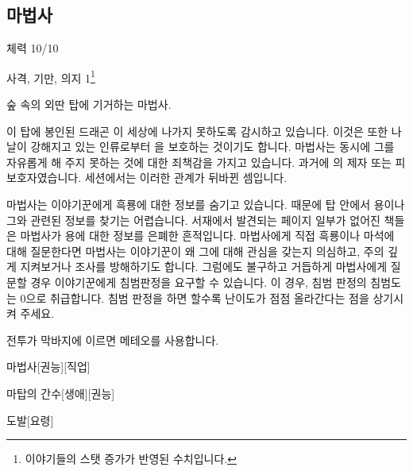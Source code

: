 \documentclass{report}
\begin{document}
	\subsection*{마법사}
		체력 10/10
		
		사격, 기만, 의지 1\footnote{이야기들의 스탯 증가가 반영된 수치입니다.}
		
		숲 속의 외딴 탑에 기거하는 마법사.

		이 탑에 봉인된 드래곤 이 세상에 나가지 못하도록 감시하고 있습니다. 이것은 또한 나날이 강해지고 있는 인류로부터 을 보호하는 것이기도 합니다. 마법사는 동시에 그를 자유롭게 해 주지 못하는 것에 대한 죄책감을 가지고 있습니다. 과거에 의 제자 또는 피보호자였습니다. 세션에서는 이러한 관계가 뒤바뀐 셈입니다.
		
		마법사는 이야기꾼에게 흑룡에 대한 정보를 숨기고 있습니다. 때문에 탑 안에서 용이나 그와 관련된 정보를 찾기는 어렵습니다. 서재에서 발견되는 페이지 일부가 없어진 책들은 마법사가 용에 대한 정보를 은폐한 흔적입니다. 마법사에게 직접 흑룡이나 마석에 대해 질문한다면 마법사는 이야기꾼이 왜 그에 대해 관심을 갖는지 의심하고, 주의 깊게 지켜보거나 조사를 방해하기도 합니다. 그럼에도 불구하고 거듭하게 마법사에게 질문할 경우 이야기꾼에게 침범판정을 요구할 수 있습니다. 이 경우, 침범 판정의 침범도는 0으로 취급합니다. 침범 판정을 하면 할수록 난이도가 점점 올라간다는 점을 상기시켜 주세요.
		
		전투가 막바지에 이르면 메테오를 사용합니다.
	
		\begin{story}{마법사}{[권능][직업]}
			
			
		\end{story}
		
		\begin{story}{마탑의 간수}{[생애][권능]}
			
		\end{story}
		
		\begin{story}{도발}{[요령]}
		\end{story}
		
\end{document}
